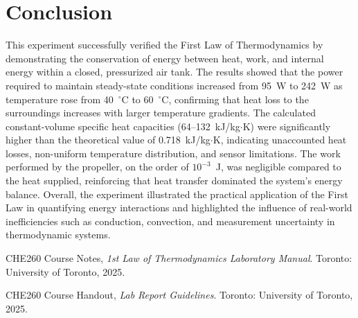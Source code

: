\documentclass[12pt]{article}
\begin{document}
\section*{Conclusion}
This experiment successfully verified the First Law of Thermodynamics by demonstrating the conservation of energy between heat, work, and internal energy within a closed, pressurized air tank. The results showed that the power required to maintain steady-state conditions increased from 95~W to 242~W as temperature rose from 40~$^{\circ}$C to 60~$^{\circ}$C, confirming that heat loss to the surroundings increases with larger temperature gradients. The calculated constant-volume specific heat capacities (64--132~kJ/kg$\cdot$K) were significantly higher than the theoretical value of 0.718~kJ/kg$\cdot$K, indicating unaccounted heat losses, non-uniform temperature distribution, and sensor limitations. The work performed by the propeller, on the order of $10^{-3}$~J, was negligible compared to the heat supplied, reinforcing that heat transfer dominated the system’s energy balance. Overall, the experiment illustrated the practical application of the First Law in quantifying energy interactions and highlighted the influence of real-world inefficiencies such as conduction, convection, and measurement uncertainty in thermodynamic systems.

\begin{thebibliography}{9}
CHE260 Course Notes, \textit{1st Law of Thermodynamics Laboratory Manual}. Toronto: University of Toronto, 2025.

CHE260 Course Handout, \textit{Lab Report Guidelines}. Toronto: University of Toronto, 2025.

\end{thebibliography}
\end{document}
